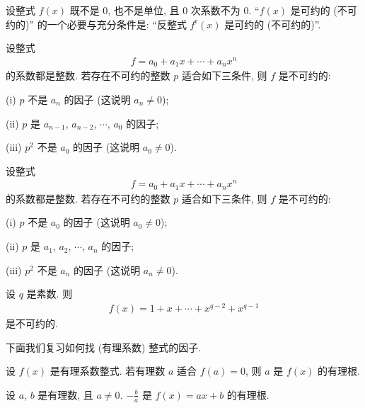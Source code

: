 \begin{proposition}
    设整式 $f(x)$ 既不是 $0$, 也不是单位, 且 $0$ 次系数不为 $0$. ``$f(x)$ 是可约的 (不可约的)'' 的一个必要与充分条件是: ``反整式 $f^{\mathrm{r}} (x)$ 是可约的 (不可约的)''.
\end{proposition}

\begin{proposition}
    设整式
    \begin{align*}
        f = a_0 + a_1 x + \cdots + a_n x^n
    \end{align*}
    的系数都是整数. 若存在不可约的整数 $p$ 适合如下三条件, 则 $f$ 是不可约的:

    (i) $p$ 不是 $a_n$ 的因子 (这说明 $a_n \neq 0$);

    (ii) $p$ 是 $a_{n-1}$, $a_{n-2}$, $\cdots$, $a_0$ 的因子;

    (iii) $p^2$ 不是 $a_0$ 的因子 (这说明 $a_0 \neq 0$).
\end{proposition}

\begin{proposition}
    设整式
    \begin{align*}
        f = a_0 + a_1 x + \cdots + a_n x^n
    \end{align*}
    的系数都是整数. 若存在不可约的整数 $p$ 适合如下三条件, 则 $f$ 是不可约的:

    (i) $p$ 不是 $a_0$ 的因子 (这说明 $a_0 \neq 0$);

    (ii) $p$ 是 $a_1$, $a_2$, $\cdots$, $a_n$ 的因子;

    (iii) $p^2$ 不是 $a_n$ 的因子 (这说明 $a_n \neq 0$).
\end{proposition}

\begin{proposition}
    设 $q$ 是素数. 则
    \begin{align*}
        f(x) = 1 + x + \cdots + x^{q-2} + x^{q-1}
    \end{align*}
    是不可约的.
\end{proposition}

下面我们复习如何找 (有理系数) 整式的因子.

\begin{definition}
    设 $f(x)$ 是有理系数整式. 若有理数 $a$ 适合 $f(a) = 0$, 则 $a$ 是 $f(x)$ 的有理根.
\end{definition}

\begin{proposition}
    设 $a$, $b$ 是有理数, 且 $a \neq 0$. $-\frac{b}{a}$ 是 $f(x) = ax + b$ 的有理根.
\end{proposition}

